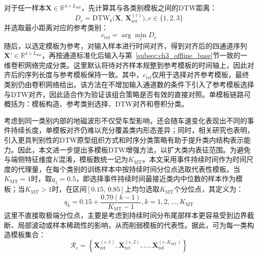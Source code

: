 \documentclass{xdupgthesis}
\begin{document}
对于任一样本$\mathbf{X}\in\mathbb{R}^{4\times L_{\mathrm{uni}}}$，先计算其与各类别模板之间的DTW距离：
\begin{equation}
    D_c=\mathrm{DTW}_{b}\big(\mathbf{X},\,\mathbf{X}_{\mathrm{ref}}^{(c)}\big), c\in\{1,2,3\}
\end{equation}
并选取最小距离对应的参考类别：
\begin{equation}
    c_{\mathrm{ref}}=\arg\min_c D_c
\end{equation}
随后，以选定模板为参考，对输入样本进行时间对齐，得到对齐后的四通道序列$\mathbf{X}'\in\mathbb{R}^{4\times L_{\mathrm{uni}}}$，再按通道标准化后输入与第~\ref{subsec:ch3_offline_base}节一致的一维卷积网络完成分类。这里默认将待对齐样本规整到参考模板的时间轴上，因此对齐后的序列长度与参考模板保持一致。其中，$c_{\mathrm{ref}}$仅用于选择对齐参考模板，最终类别仍由卷积网络给出。该方法在不增加输入通道数的条件下引入了参考模板选择与DTW对齐，因此适合作为验证该组合策略是否有效的直接对照。单模板链路可概括为：模板构造、参考类别选择、DTW对齐和卷积分类。

考虑到同一类别内部的地磁波形不仅受车型影响，还会随车速变化表现出不同的事件持续长度，单模板对齐仍难以充分覆盖类内形态差异；同时，相关研究也表明，引入更具判别性的DTW原型组织方式和时序分类策略有助于提升类内结构表示能力\cite{chang2021dpdtw,zhang2023tsc_review}。因此，本文进一步提出多模板DTW增强方法，以扩大类内表征范围。为避免与端侧特征维度$K$混淆，模板数统一记为$K_{\mathrm{MT}}$。本文采用事件持续时间作为时间尺度的代理量，在每个类别的训练样本中按持续时间分位点选取代表性模板。当$K_{\mathrm{MT}}=1$时，取$q_1=0.5$，即选择事件持续时间最接近类内中位数的样本作为模板；当$K_{\mathrm{MT}}>1$时，在区间$[0.15,\,0.85]$上均匀选取$K_{\mathrm{MT}}$个分位点，其定义为：
\begin{equation}
    q_k=0.15+\frac{0.70(k-1)}{K_{\mathrm{MT}}-1}, k=1,2,\ldots,K_{\mathrm{MT}}
\end{equation}
这里不直接取极端分位点，主要是考虑到持续时间分布尾部样本更容易受到边界截断、局部波动或样本稀疏性的影响，从而削弱模板的代表性。据此，可为每一类构造模板集合：
\begin{equation}
    \mathcal{R}_c=
    \left\{
    \mathbf{X}_{\mathrm{ref}}^{(c,1)},
    \mathbf{X}_{\mathrm{ref}}^{(c,2)},
    \ldots,
    \mathbf{X}_{\mathrm{ref}}^{(c,K_{\mathrm{MT}})}
    \right\}
\end{equation}
\end{document}
